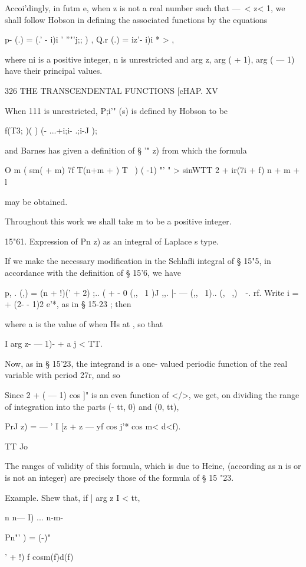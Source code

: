 {{{Accoi'dingly, in futm e, when z is not a real number such that —\ < z<
1, we shall follow Hobson in defining the associated functions by the
equations

p- (.) = (.' - i)i ' ''"'j;; ) , Q.r (.) = iz'- i)i * > ,

where ni is a positive integer, n is unrestricted and arg z, arg ( +
1), arg ( — 1) have their principal values.

326 THE TRANSCENDENTAL FUNCTIONS [cHAP. XV

When 111 is unrestricted, P;i'" (s) is defined by Hobson to be

f(T3; )( ) (- ...+i;i- .;i-J );

and Barnes has given a definition of § '" z) from which the formula

O m ( sm( + m) 7f T(n+m + ) T \ ) ( -1) "' " > sinWTT 2 + ir(7i + f) n
+ m + l

may be obtained.

Throughout this work we shall take m to be a positive integer.

15"61. Expression of Pn z) as an integral of Laplace s type.

If we make the necessary modification in the Schlafli integral of §
15"5, in accordance with the definition of § 15'6, we have

p, . (,) = (n + !)(' + 2) ;.. ( + - 0 (,, \ 1 )J ,,. |- --- (,, \ 1)..
(, \ ,)\ \ -. rf. Write i = + (2- - 1)2 e'*, as in § 15-23 ; then

where a is the value of when Hs at , so that

I arg z- — 1)- + a j < TT.

Now, as in § 15'23, the integrand is a one- valued periodic function
of the real variable with period 27r, and so

Since 2 + ( — 1) cos ]" is an even function of </>, we get, on
dividing the range of integration into the parts (- tt, 0) and (0,
tt),

PrJ z) = — ' I [z + z — yf cos j'* cos m< d<f).

TT Jo

The ranges of validity of this formula, which is due to Heine,
(according as n is or is not an integer) are precisely those of the
formula of § 15 "23.

Example. Shew that, if | arg z I < tt,

n n— I) ... n-m-

Pn"' ) = (-)"

' + !) f cosm(f)d(f)

}}}
